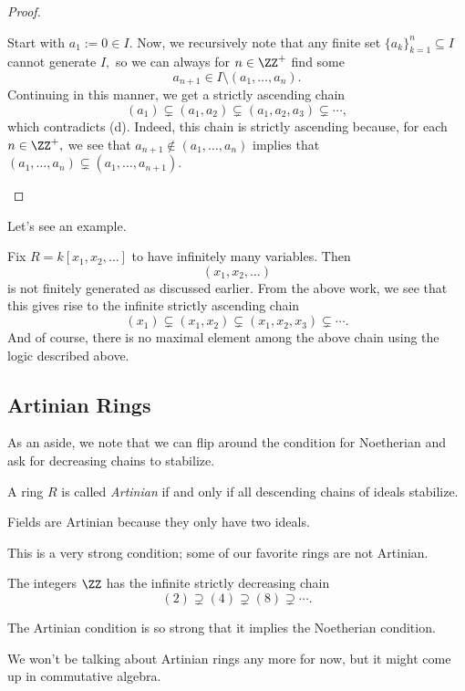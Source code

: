 \begin{proof}
\begin{itemize}
		Start with $a_1:=0\in I.$ Now, we recursively note that any finite set $\{a_k\}_{k=1}^n\subseteq I$ cannot generate $I,$ so we can always for $n\in\ZZ^+$ find some
		\[a_{n+1}\in I\setminus(a_1,\ldots,a_n).\]
		Continuing in this manner, we get a strictly ascending chain
		\[(a_1)\subsetneq(a_1,a_2)\subsetneq(a_1,a_2,a_3)\subsetneq\cdots,\]
		which contradicts (d). Indeed, this chain is strictly ascending because, for each $n\in\ZZ^+,$ we see that $a_{n+1}\notin(a_1,\ldots,a_n)$ implies that $(a_1,\ldots,a_n)\subsetneq(a_1,\ldots,a_{n+1}).$
		\qedhere
	\end{itemize}
\end{proof}
Let's see an example.
\begin{ex}
	Fix $R=k[x_1,x_2,\ldots]$ to have infinitely many variables. Then
	\[(x_1,x_2,\ldots)\]
	is not finitely generated as discussed earlier. From the above work, we see that this gives rise to the infinite strictly ascending chain
	\[(x_1)\subsetneq(x_1,x_2)\subsetneq(x_1,x_2,x_3)\subsetneq\cdots.\]
	And of course, there is no maximal element among the above chain using the logic described above.
\end{ex}

\subsection{Artinian Rings}
As an aside, we note that we can flip around the condition for Noetherian and ask for decreasing chains to stabilize.
\begin{definition}[Artinian]
	A ring $R$ is called \textit{Artinian} if and only if all descending chains of ideals stabilize.
\end{definition}
\begin{example}
	Fields are Artinian because they only have two ideals.
\end{example}
This is a very strong condition; some of our favorite rings are not Artinian.
\begin{nex}
	The integers $\ZZ$ has the infinite strictly decreasing chain
	\[(2)\supsetneq(4)\supsetneq(8)\supsetneq\cdots.\]
\end{nex}
\begin{remark}
	The Artinian condition is so strong that it implies the Noetherian condition.
\end{remark}
We won't be talking about Artinian rings any more for now, but it might come up in commutative algebra.

